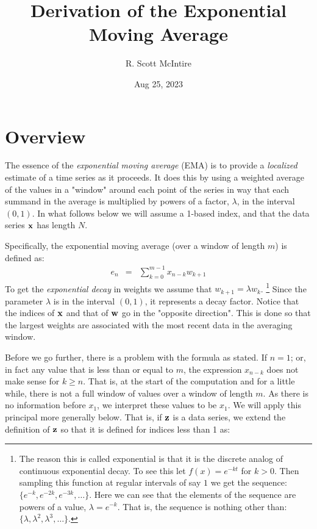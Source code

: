 \documentclass{article}
\title{Derivation of the Exponential Moving Average}
\author{R. Scott McIntire}
\date{Aug 25, 2023}
\begin{document}
\maketitle


\section{Overview}

The essence of the {\em exponential moving average\/} (EMA) is to provide 
a {\em localized\/} estimate of a time series as it proceeds. It does 
this by using a weighted average of the values in a "window" around each point 
of the series in way that each summand in 
the average is multiplied by powers of a factor, $\lambda$,
in the interval $(0,1)$.
In what follows below we will assume a 1-based index, and that 
the data series ${\bf x}$ has length $N$.

Specifically, the exponential moving average (over a window of length $m$) 
is defined as:
\begin{eqnarray}
    e_n & = & \sum_{k=0}^{m-1} x_{n-k} w_{k+1} \label{ema_def}
\end{eqnarray}
To get the {\em exponential decay\/} in weights we assume that $w_{k+1} = \lambda w_k$.%
\footnote{The reason this is called exponential is that it is the discrete
analog of continuous exponential decay. To see this let $f(x) = e^{-kt}$ 
for $k > 0$. Then sampling this function at regular intervals of say $1$ 
we get the sequence: $\{ e^{-k}, e^{-2k}, e^{-3k}, \ldots \}$.
Here we can see that the elements of the sequence are powers of a value, $\lambda = e^{-k}$.
That is, the sequence is nothing other than: $\{\lambda, \lambda^2, \lambda^3, \ldots \}$.}
Since the parameter $\lambda$ is in the interval $(0,1)$, it represents a decay factor. 
Notice that the indices of ${\bf x}$ and that of ${\bf w}$ go in the "opposite direction".
This is done so that the largest weights are associated with the most recent data
in the averaging window.

Before we go further, there is a problem with the formula as stated.
If $n = 1$; or, in fact any value that is less than or equal to $m$,
the expression $x_{n-k}$ does not make sense for $k \ge n$. That is, at the 
start of the computation and for a little while, there is not a full window
of values over a window of length $m$. As there is no information before $x_1$,
we interpret these values to be $x_1$. 
We will apply this principal more generally below. 
That is, if ${\bf z}$ is a data series,
we extend the definition of ${\bf z}$ so that it is defined for
indices less than 1 as:
\end{document}
